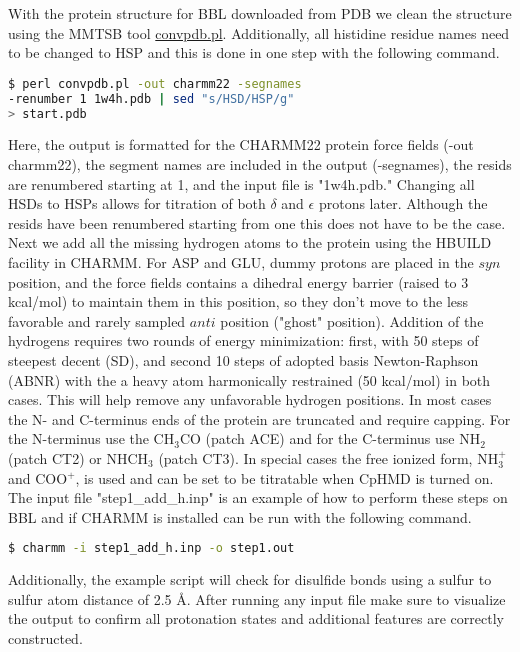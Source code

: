 \documentclass[9pt,tutorial]{livecoms}
\begin{document}
With the protein structure for BBL downloaded from PDB we clean the structure using the MMTSB\cite{Feig_JMolGraphModel_2004_v22_p377} tool \href{http://blue11.bch.msu.edu/mmtsb/convpdb.pl}{convpdb.pl}. 
Additionally, all histidine residue names need to be changed to HSP and this is done in one step with the following command. 
%
\begin{lstlisting}[language=bash]
$ perl convpdb.pl -out charmm22 -segnames
-renumber 1 1w4h.pdb | sed "s/HSD/HSP/g" 
> start.pdb
\end{lstlisting}
%
Here, the output is formatted for the CHARMM22 protein force fields (-out charmm22), the segment names are included in the output (-segnames), the resids are renumbered starting at 1, and the input file is "1w4h.pdb."
Changing all HSDs to HSPs allows for titration of both $\delta$ and $\epsilon$ protons later.
Although the resids have been renumbered starting from one this does not have to be the case. 
Next we add all the missing hydrogen atoms to the protein using the HBUILD facility\cite{Brunger_Proteins_1988_v4_p148} in CHARMM.
For ASP and GLU, dummy protons are placed in the $syn$ position, and the force fields contains a dihedral energy barrier (raised to 3 kcal/mol) to maintain them in this position, so they don't move to the less favorable and rarely sampled $anti$ position ("ghost" position).\cite{Khandogin_BiophysJ_2005_v89_p141, Mongan_JComputChem_2004_v25_p2038} 
Addition of the hydrogens requires two rounds of energy minimization: first, with 50 steps of steepest decent (SD), and second 10 steps of adopted basis Newton-Raphson (ABNR) with the a heavy atom harmonically restrained (50 kcal/mol) in both cases.
This will help remove any unfavorable hydrogen positions. 
In most cases the N- and C-terminus ends of the protein are truncated and require capping. 
For the N-terminus use the CH$_3$CO (patch ACE) and for the C-terminus use NH$_2$ (patch CT2) or NHCH$_3$ (patch CT3).
In special cases the free ionized form, NH$_{3}^{+}$ and COO$^+$, is used and can be set to be titratable when CpHMD is turned on. 
The input file "step1\_add\_h.inp" is an example of how to perform these steps on BBL and if CHARMM is installed can be run with the following command.
%
\begin{lstlisting}[language=bash]
$ charmm -i step1_add_h.inp -o step1.out
\end{lstlisting}
%
Additionally, the example script will check for disulfide bonds using a sulfur to sulfur atom distance of 2.5 \mbox{\AA}. 
After running any input file make sure to visualize the output to confirm all protonation states and additional features are correctly constructed. 
\end{document}
